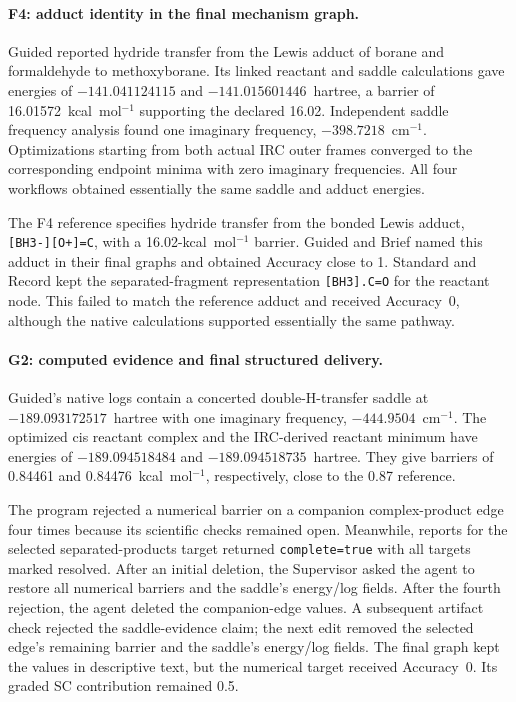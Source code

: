 \paragraph{F4: adduct identity in the final mechanism graph.}
Guided reported hydride transfer from the Lewis adduct of borane and formaldehyde to methoxyborane. Its linked reactant and saddle calculations gave energies of $-141.041124115$ and $-141.015601446$~hartree, a barrier of 16.01572~kcal~mol$^{-1}$ supporting the declared 16.02. Independent saddle frequency analysis found one imaginary frequency, $-398.7218$~cm$^{-1}$. Optimizations starting from both actual IRC outer frames converged to the corresponding endpoint minima with zero imaginary frequencies. All four workflows obtained essentially the same saddle and adduct energies.

The F4 reference specifies hydride transfer from the bonded Lewis adduct, \texttt{[BH3-][O+]=C}, with a 16.02-kcal~mol$^{-1}$ barrier. Guided and Brief named this adduct in their final graphs and obtained Accuracy close to 1. Standard and Record kept the separated-fragment representation \texttt{[BH3].C=O} for the reactant node. This failed to match the reference adduct and received Accuracy~0, although the native calculations supported essentially the same pathway.

\paragraph{G2: computed evidence and final structured delivery.}
Guided's native logs contain a concerted double-H-transfer saddle at $-189.093172517$~hartree with one imaginary frequency, $-444.9504$~cm$^{-1}$. The optimized cis reactant complex and the IRC-derived reactant minimum have energies of $-189.094518484$ and $-189.094518735$~hartree. They give barriers of 0.84461 and 0.84476~kcal~mol$^{-1}$, respectively, close to the 0.87 reference.

The program rejected a numerical barrier on a companion complex-product edge four times because its scientific checks remained open. Meanwhile, reports for the selected separated-products target returned \texttt{complete=true} with all targets marked resolved. After an initial deletion, the Supervisor asked the agent to restore all numerical barriers and the saddle's energy/log fields. After the fourth rejection, the agent deleted the companion-edge values. A subsequent artifact check rejected the saddle-evidence claim; the next edit removed the selected edge's remaining barrier and the saddle's energy/log fields. The final graph kept the values in descriptive text, but the numerical target received Accuracy~0. Its graded SC contribution remained 0.5.


